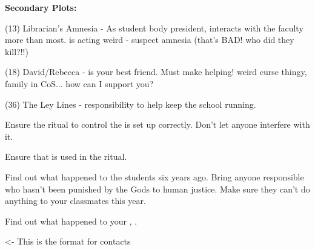 \documentclass[char]{GL2020}
\begin{document}
\textbf{Secondary Plots:}

(13) Librarian’s Amnesia - As student body president, interacts with the faculty more than most. \cLibrarian{} is acting weird - suspect amnesia (that's BAD! who did they kill?!!)

(18) David/Rebecca - \cIntiate{} is your best friend. Must make helping! weird curse thingy, family in CoS... how can I support you?

(36) The Ley Lines - responsibility to help keep the school running.


\begin{itemz}[Goals]
	\item  Ensure the ritual to control the is set up correctly. Don't let anyone interfere with it.
	\item Ensure that \iNet{} is used in the ritual.
	\item Find out what happened to the students six years ago. Bring anyone responsible who hasn't been punished  by the Gods to human justice. Make sure they can't do anything to your classmates this year.
	\item Find out what happened to your \cHeadDiplomat{\auncle}, \cHeadDiplomat{}.
\end{itemz}

\begin{itemz}[Notes]
	\item 
\end{itemz}

\begin{contacts}
	\contact{\cTest{}} <- This is the format for contacts
	
\end{contacts}
\end{document}

